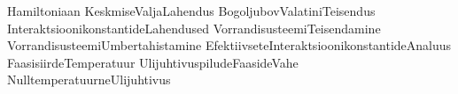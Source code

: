 \documentclass[12pt,a4]{article}
\numberwithin{equation}{section}
\begin{document}
{Hamiltoniaan}
{KeskmiseValjaLahendus}
{BogoljubovValatiniTeisendus}
{InteraktsioonikonstantideLahendused}
{VorrandisusteemiTeisendamine}
{VorrandisusteemiUmbertahistamine}
{EfektiivseteInteraktsioonikonstantideAnaluus}
{FaasisiirdeTemperatuur}
{UlijuhtivuspiludeFaasideVahe}
{NulltemperatuurneUlijuhtivus}
\end{document}
